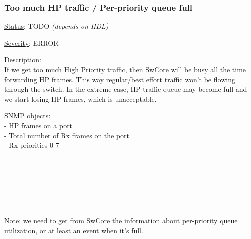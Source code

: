 \subsubsection{\bf Too much HP traffic / Per-priority queue full}
		\label{fail:data:too_much_HP}
		\begin{packed_enum}
			\item [] \underline{Status}: TODO \emph{(depends on HDL)}
			\item [] \underline{Severity}: ERROR
			\item [] \underline{Description}:\\
				If we get too much High Priority traffic, then SwCore will be busy all
				the time forwarding HP frames. This way regular/best effort traffic
				won't be flowing through the switch. In the extreme case, HP traffic
				queue may become full and we start losing HP frames, which is
				unacceptable.
			\item [] \underline{SNMP objects}:\\
				 - HP frames on a port\\
				 - Total number of Rx frames on
				the port\\
				 - Rx priorities 0-7\\
				 \\
				 \\
				 \\
				 \\
				 \\
				 \\
			\item [] \underline{Note}: we need to get from SwCore the information
				about per-priority queue utilization, or at least an event when it's
				full.
		\end{packed_enum}

